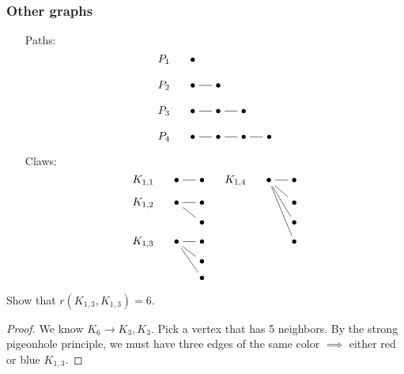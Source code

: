 \documentclass[12pt]{article}
\begin{document}
\subsubsection{Other graphs}
\begin{itemize}[align=left]
    \item[Paths: ] \[\begin{tikzcd}[ampersand replacement=\&,cramped,sep=small]
        {P_1} \& \bullet \\
        {P_2} \& \bullet \& \bullet \\
        {P_3} \& \bullet \& \bullet \& \bullet \\
        {P_4} \& \bullet \& \bullet \& \bullet \& \bullet
        \arrow[no head, from=2-2, to=2-3]
        \arrow[no head, from=3-2, to=3-3]
        \arrow[no head, from=3-3, to=3-4]
        \arrow[no head, from=4-2, to=4-3]
        \arrow[no head, from=4-3, to=4-4]
        \arrow[no head, from=4-4, to=4-5]
    \end{tikzcd}\]
    \item[Claws: ]  \[\begin{tikzcd}[ampersand replacement=\&,cramped,column sep=small,row sep=tiny]
        {K_{1,1}} \& \bullet \& \bullet \& {K_{1,4}} \& \bullet \& \bullet \\
        {K_{1,2}} \& \bullet \& \bullet \&\&\& \bullet \\
        \&\& \bullet \&\&\& \bullet \\
        {K_{1,3}} \& \bullet \& \bullet \&\&\& \bullet \\
        \&\& \bullet \\
        \&\& \bullet
        \arrow[no head, from=1-2, to=1-3]
        \arrow[no head, from=2-2, to=2-3]
        \arrow[no head, from=2-2, to=3-3]
        \arrow[no head, from=4-2, to=4-3]
        \arrow[no head, from=5-3, to=4-2]
        \arrow[no head, from=6-3, to=4-2]
        \arrow[no head, from=1-5, to=1-6]
        \arrow[no head, from=2-6, to=1-5]
        \arrow[no head, from=3-6, to=1-5]
        \arrow[no head, from=4-6, to=1-5]
    \end{tikzcd}\]
\end{itemize}

\eg Show that $r(K_{1,3}, K_{1,3}) = 6$.
\begin{proof}
    We know $K_6\to K_3,K_3$. Pick a vertex that has 5 neighbors. By the strong pigeonhole principle, we must have three edges of the same color $\implies$ either red or blue $K_{1,3}$.
\end{proof}
\end{document}

